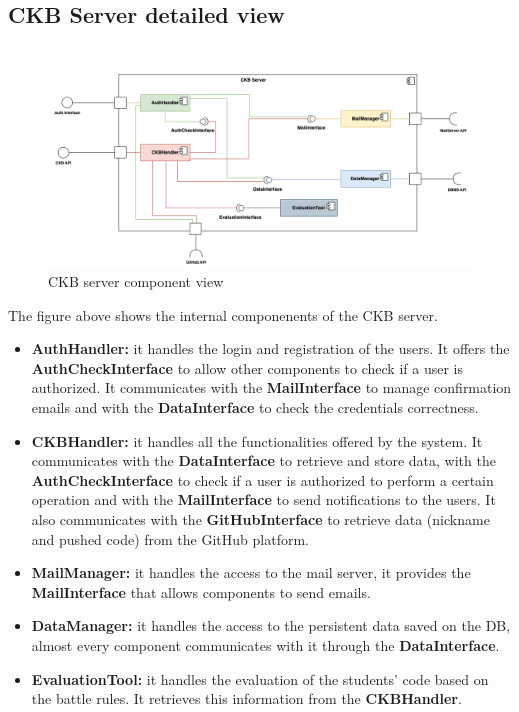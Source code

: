\subsection{CKB Server detailed view}
\begin{figure}[H]
    \centering
    \includegraphics[width=\textwidth]{images/component_view/CKB_component.png}
    \caption{CKB server component view}
\end{figure}
The figure above shows the internal componenents of the CKB server.
\begin{itemize}
    \item \textbf{AuthHandler: } it handles the login and registration of the users. It offers the \textbf{AuthCheckInterface} to allow other components to check 
    if a user is authorized. It communicates with the \textbf{MailInterface} to manage confirmation emails and with the \textbf{DataInterface} to check the credentials
    correctness.
    \item \textbf{CKBHandler: } it handles all the functionalities offered by the system. It communicates with the \textbf{DataInterface} to retrieve and store data, with 
    the \textbf{AuthCheckInterface} to check if a user is authorized to perform a certain operation and with the \textbf{MailInterface} to send notifications to the users.
    It also communicates with the \textbf{GitHubInterface} to retrieve data (nickname and pushed code) from the GitHub platform.
    \item \textbf{MailManager: } it handles the access to the mail server, it provides the \textbf{MailInterface} that allows components to send emails.
    \item \textbf{DataManager: } it handles the access to the persistent data saved on the DB, almost every component communicates with it through the \textbf{DataInterface}.
    \item \textbf{EvaluationTool: } it handles the evaluation of the students' code based on the battle rules. It retrieves this information from the \textbf{CKBHandler}.
\end{itemize}


